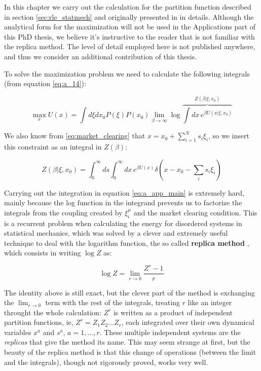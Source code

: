 In this chapter we carry out the calculation for the partition function described in section \ref{sec:rle_statmech} and originally presented in \cite{DeMartinoMarsili04} in details. Although the analytical form for the maximization will not be used in the Applications part of this PhD thesis, we believe it's instructive to the reader that is not familiar with the replica method. The level of detail employed here is not published anywhere, and thus we consider an additional contribution of this thesis.

To solve the maximization problem we need to calculate the following integrals (from equation \eqref{eq:a_14}):

\begin{equation}
    \label{eq:a_app_main}
    \max_x U(x) = \int d\xi dx_0 P(\xi) P(x_0)  \lim_{\beta\to\infty} \log \overbrace{\int dx\, e^{\beta U(x| \xi, x_0)}}^{Z(\beta | \xi, x_0)}
\end{equation}

We also know from \eqref{eq:market_clearing} that $x = x_0 +
\sum_{i=1}^N s_i \xi_i$, so we insert this constraint as an integral in $Z(\beta)$:

\begin{equation}
    \label{eq:a_appZ}
    Z(\beta | \xi, x_0) = \int_0^\infty ds \int_0^\infty dx\, e^{\beta U(x)} \delta\left(x - x_0 - \sum_i s_i \xi_i \right)
\end{equation}

Carrying out the integration in equation \eqref{eq:a_app_main} is
extremely hard, mainly because the log function in the integrand
prevents us to factorize the integrals from the coupling created by
$\xi_i^\mu$ and the market clearing condition. This is a recurrent
problem when calculating the energy for disordered systems in
statistical mechanics, which was solved by a clever and extremely
useful technique to deal with the logarithm function, the so called
\textbf{replica method} \cite{NishimoriBook}, which consists in
writing $\log Z$ as:

\begin{equation}
    \label{eq:a_replica_trick}
    \log Z = \lim_{r\to 0} \frac{Z^r - 1}{r}
\end{equation}

The identity above is still exact, but the clever part of the method
is exchanging the $\lim_{r\to 0}$ term with the rest of the
integrals, treating $r$ like an integer throught the whole
calculation: $Z^r$ is written as a product of independent partition
functions, ie, $Z^r = Z_1 Z_2 \ldots Z_r$, each integrated over their
own dynamical variables $x^a$ and $s^a$, $a = 1, \ldots, r$. These
multiple independent systems are the \emph{replicas} that give the
method its name. This may seem strange at first, but the beauty of the
replica method is that this change of operations (between the limit
and the integrals), though not rigorously proved, works very well.

